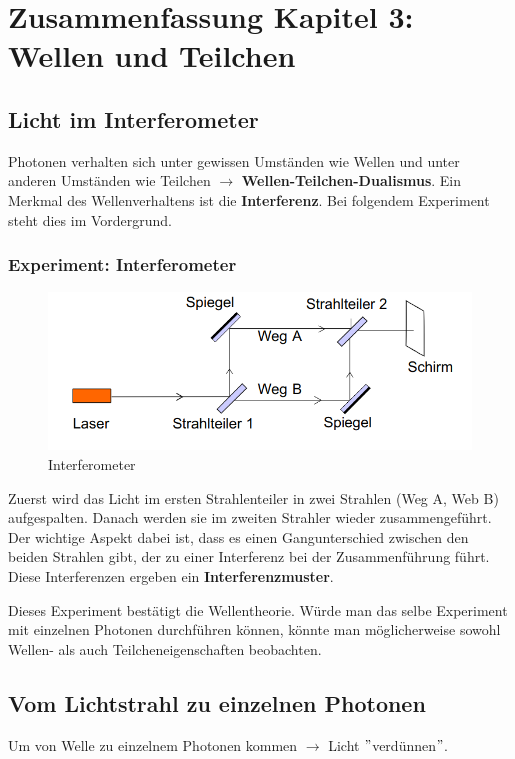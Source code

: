 \documentclass[a4paper, ngerman]{article}
\begin{document}
\section*{Zusammenfassung Kapitel 3: Wellen und Teilchen}
\subsection*{Licht im Interferometer}
Photonen verhalten sich unter gewissen Umständen wie Wellen und unter anderen Umständen wie Teilchen $\rightarrow$ \textbf{Wellen-Teilchen-Dualismus}. Ein Merkmal
des Wellenverhaltens ist die \textbf{Interferenz}. Bei folgendem Experiment steht dies im Vordergrund.
\subsubsection*{Experiment: Interferometer}

\begin{figure}[H]
    \centering
    \includegraphics[scale=0.5]{Interferometer.png}
    \caption{Interferometer}
\end{figure}

Zuerst wird das Licht im ersten Strahlenteiler in zwei Strahlen (Weg A, Web B) aufgespalten.
Danach werden sie im zweiten Strahler wieder zusammengeführt. Der wichtige Aspekt dabei ist, dass
es einen Gangunterschied zwischen den beiden Strahlen gibt, der zu einer Interferenz bei der Zusammenführung führt.
Diese Interferenzen ergeben ein \textbf{Interferenzmuster}.

Dieses Experiment bestätigt die Wellentheorie. Würde man das selbe Experiment mit einzelnen Photonen durchführen können,
könnte man möglicherweise sowohl Wellen- als auch Teilcheneigenschaften beobachten.

\subsection*{Vom Lichtstrahl zu einzelnen Photonen}
Um von Welle zu einzelnem Photonen kommen $\rightarrow$ Licht $"$verdünnen$"$.
\end{document}
